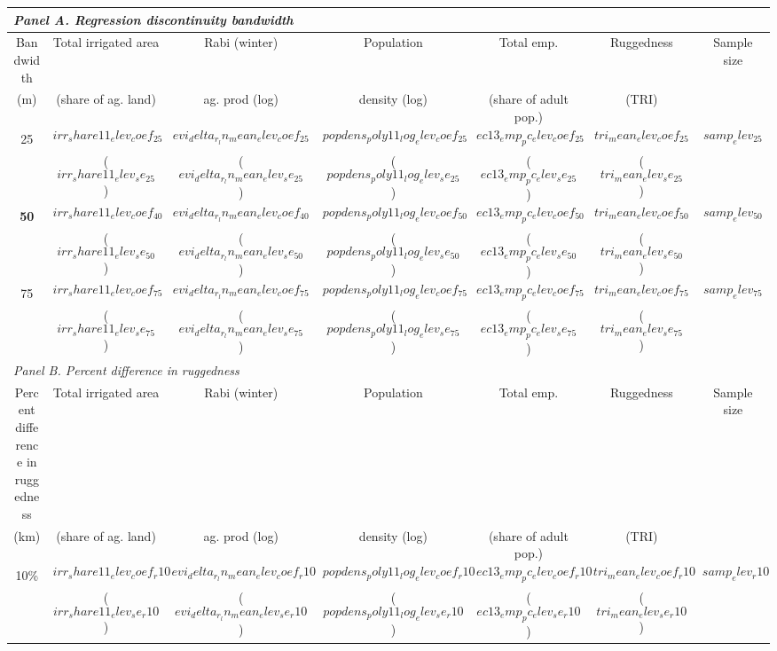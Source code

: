 {\setlength{\tabcolsep}{0.5em}
  \begin{tabular}{c|cccc|c|c}
    \multicolumn{7}{l}{\textit{Panel A. Regression discontinuity bandwidth}} \\
    \hline\hline
    Bandwidth & Total irrigated area & Rabi (winter) & Population & Total emp. & Ruggedness & Sample size \\
    (m) & (share of ag. land) & ag. prod (log) & density (log) & (share of adult pop.) & (TRI) & \\
    \hline    
    25 & $$irr_share11_elev_coef_25$$  & $$evi_delta_r_ln_mean_elev_coef_25$$  & $$popdens_poly11_log_elev_coef_25$$ & $$ec13_emp_pc_elev_coef_25$$ & $$tri_mean_elev_coef_25$$ & $$samp_elev_25$$\\
    &  ($$irr_share11_elev_se_25$$)  & ($$evi_delta_r_ln_mean_elev_se_25$$)  & ($$popdens_poly11_log_elev_se_25$$) & ($$ec13_emp_pc_elev_se_25$$) & ($$tri_mean_elev_se_25$$) &\\  
    
    \textbf{50} & $$irr_share11_elev_coef_40$$  & $$evi_delta_r_ln_mean_elev_coef_40$$  & $$popdens_poly11_log_elev_coef_50$$ & $$ec13_emp_pc_elev_coef_50$$ & $$tri_mean_elev_coef_50$$ & $$samp_elev_50$$\\
    &  ($$irr_share11_elev_se_50$$)  & ($$evi_delta_r_ln_mean_elev_se_50$$)  & ($$popdens_poly11_log_elev_se_50$$) & ($$ec13_emp_pc_elev_se_50$$) & ($$tri_mean_elev_se_50$$) & \\

    75 & $$irr_share11_elev_coef_75$$  & $$evi_delta_r_ln_mean_elev_coef_75$$  & $$popdens_poly11_log_elev_coef_75$$ & $$ec13_emp_pc_elev_coef_75$$ & $$tri_mean_elev_coef_75$$ & $$samp_elev_75$$\\
    &  ($$irr_share11_elev_se_75$$)  & ($$evi_delta_r_ln_mean_elev_se_75$$)  & ($$popdens_poly11_log_elev_se_75$$) & ($$ec13_emp_pc_elev_se_75$$) & ($$tri_mean_elev_se_75$$) & \\


    \multicolumn{7}{l}{\textit{Panel B. Percent difference in ruggedness}} \\
    \hline\hline
    Percent difference in ruggedness  & Total irrigated area & Rabi (winter) & Population & Total emp. & Ruggedness & Sample size \\
    (km) & (share of ag. land) & ag. prod (log) & density (log) & (share of adult pop.) & (TRI) & \\
    \hline
    10\% & $$irr_share11_elev_coef_r10$$  & $$evi_delta_r_ln_mean_elev_coef_r10$$  & $$popdens_poly11_log_elev_coef_r10$$ & $$ec13_emp_pc_elev_coef_r10$$ & $$tri_mean_elev_coef_r10$$ & $$samp_elev_r10$$\\
    &  ($$irr_share11_elev_se_r10$$)  & ($$evi_delta_r_ln_mean_elev_se_r10$$)  & ($$popdens_poly11_log_elev_se_r10$$) & ($$ec13_emp_pc_elev_se_r10$$) & ($$tri_mean_elev_se_r10$$) &\\
    

\end{tabular}}

